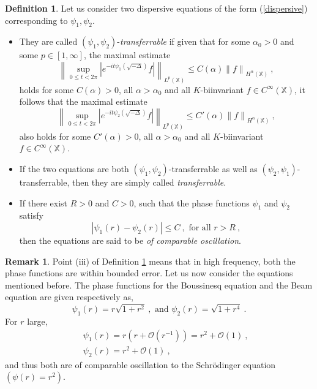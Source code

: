 \documentclass[12pt]{amsart}
\theoremstyle{definition}
\newtheorem{definition}[theorem]{Definition}
\newtheorem{remark}[theorem]{Remark}
\newcommand{\X}{\mathbb X}%
\numberwithin{equation}{section}
\begin{document}
\begin{definition} \label{my_defn}
Let us consider two dispersive equations of the form (\ref{dispersive}) corresponding to $\psi_1,\psi_2$.
\begin{itemize}
\item[(i)] They are called $(\psi_1,\psi_2)$-{\it transferrable} if given that for some $\alpha_0>0$ and some $p \in [1,\infty]$, the maximal estimate 
\begin{equation*}
\left\|\sup_{0 \le t < 2\pi} \left|e^{-it\psi_1\left(\sqrt{-\Delta}\right)} f \right|\right\|_{L^p(\X)} \le C(\alpha) {\|f\|}_{H^\alpha(\X)}\:,
\end{equation*}
holds for some $C(\alpha)>0$, all $\alpha >\alpha_0$ and all $K$-biinvariant $f \in C^\infty(\X)$, it follows that the maximal estimate 
\begin{equation*}
\left\|\sup_{0 \le t < 2\pi} \left|e^{-it\psi_2\left(\sqrt{-\Delta}\right)} f \right|\right\|_{L^p(\X)} \le C'(\alpha) {\|f\|}_{H^\alpha(\X)}\:,
\end{equation*}
also holds for some $C'(\alpha)>0$, all $\alpha >\alpha_0$ and all $K$-biinvariant $f \in C^\infty(\X)$. 

\item[(ii)] If the two equations are both $(\psi_1,\psi_2)$-transferrable as well as $(\psi_2,\psi_1)$-transferrable, then they are simply called {\it transferrable}.

\item[(iii)] If there exist $R>0$ and $C>0$, such that the phase functions $\psi_1$ and $\psi_2$ satisfy
\begin{equation*}
\left|\psi_1(r)-\psi_2(r)\right| \le C\:, \text{ for all } r > R\:,
\end{equation*} 
then the equations are said to be {\it of comparable oscillation}. 
\end{itemize}
\end{definition}

\begin{remark} \label{examples_remark}
Point (iii) of Definition \ref{my_defn} means that in high frequency, both the phase functions are within bounded error. Let us now consider the equations mentioned before. The phase functions for the Boussinesq equation and the Beam equation are given respectively as,
\begin{equation*}
\psi_1(r)= r \sqrt{1+r^2} \:, \text{ and } \psi_2(r)=  \sqrt{1+r^4}\:.
\end{equation*}
For $r$ large,
\begin{eqnarray*}
&&\psi_1(r)= r \left(r + \mathcal{O}(r^{-1})\right) = r^2 + \mathcal{O}(1)\:,\\
&&\psi_2(r)= r^2 + \mathcal{O}(1)\:,
\end{eqnarray*}
and thus both are of comparable oscillation to the Schr\"odinger equation $(\psi(r)=r^2)$. 
\end{remark}
\end{document}
